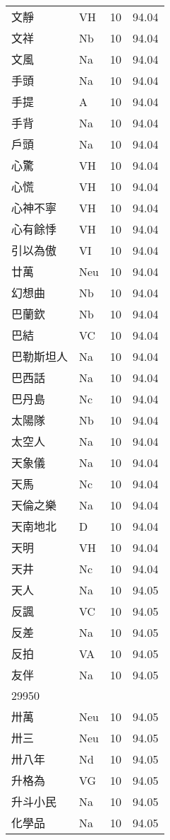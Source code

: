 \documentclass[twocolumn]{book}
\begin{document}
\begin{supertabular}{llrr}
文靜 & VH & 10 &  94.04\\
文祥 & Nb & 10 &  94.04\\
文風 & Na & 10 &  94.04\\
手頭 & Na & 10 &  94.04\\
手提 & A & 10 &  94.04\\
手背 & Na & 10 &  94.04\\
戶頭 & Na & 10 &  94.04\\
心驚 & VH & 10 &  94.04\\
心慌 & VH & 10 &  94.04\\
心神不寧 & VH & 10 &  94.04\\
心有餘悸 & VH & 10 &  94.04\\
引以為傲 & VI & 10 &  94.04\\
廿萬 & Neu & 10 &  94.04\\
幻想曲 & Nb & 10 &  94.04\\
巴蘭欽 & Nb & 10 &  94.04\\
巴結 & VC & 10 &  94.04\\
巴勒斯坦人 & Na & 10 &  94.04\\
巴西話 & Na & 10 &  94.04\\
巴丹島 & Nc & 10 &  94.04\\
太陽隊 & Nb & 10 &  94.04\\
太空人 & Na & 10 &  94.04\\
天象儀 & Na & 10 &  94.04\\
天馬 & Nc & 10 &  94.04\\
天倫之樂 & Na & 10 &  94.04\\
天南地北 & D & 10 &  94.04\\
天明 & VH & 10 &  94.04\\
天井 & Nc & 10 &  94.04\\
天人 & Na & 10 &  94.05\\
反諷 & VC & 10 &  94.05\\
反差 & Na & 10 &  94.05\\
反拍 & VA & 10 &  94.05\\
友伴 & Na & 10 &  94.05\\
29950\\
卅萬 & Neu & 10 &  94.05\\
卅三 & Neu & 10 &  94.05\\
卅八年 & Nd & 10 &  94.05\\
升格為 & VG & 10 &  94.05\\
升斗小民 & Na & 10 &  94.05\\
化學品 & Na & 10 &  94.05\\

\end{supertabular}
\end{document}
